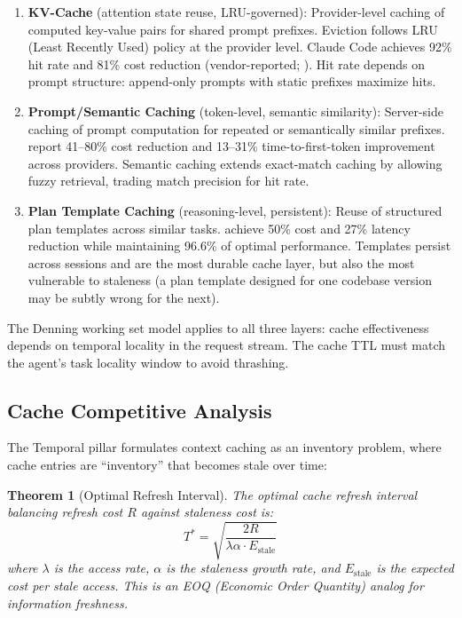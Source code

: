 \documentclass[11pt, a4paper]{googledeepmind}
\newtheorem{theorem}{Theorem}[section]
\begin{document}
\begin{enumerate}
    \item \textbf{KV-Cache} (attention state reuse, LRU-governed): Provider-level caching of computed key-value pairs for shared prompt prefixes. Eviction follows LRU (Least Recently Used) policy at the provider level. Claude Code achieves 92\% hit rate and 81\% cost reduction (vendor-reported; \citealt{anthropic2026agentic}). Hit rate depends on prompt structure: append-only prompts with static prefixes maximize hits.

    \item \textbf{Prompt/Semantic Caching} (token-level, semantic similarity): Server-side caching of prompt computation for repeated or semantically similar prefixes. \citet{liang2026cache} report 41--80\% cost reduction and 13--31\% time-to-first-token improvement across providers. Semantic caching extends exact-match caching by allowing fuzzy retrieval, trading match precision for hit rate.

    \item \textbf{Plan Template Caching} (reasoning-level, persistent): Reuse of structured plan templates across similar tasks. \citet{zhang2025apc} achieve 50\% cost and 27\% latency reduction while maintaining 96.6\% of optimal performance. Templates persist across sessions and are the most durable cache layer, but also the most vulnerable to staleness (a plan template designed for one codebase version may be subtly wrong for the next).
\end{enumerate}

The Denning working set model \citep{denning1968working} applies to all three layers: cache effectiveness depends on temporal locality in the request stream. The cache TTL must match the agent's task locality window to avoid thrashing.

\subsection{Cache Competitive Analysis}

The Temporal pillar formulates context caching as an inventory problem, where cache entries are ``inventory'' that becomes stale over time:

\begin{theorem}[Optimal Refresh Interval]
\label{thm:cache-eoq}
The optimal cache refresh interval balancing refresh cost $R$ against staleness cost is:
\begin{equation}
    T^* = \sqrt{\frac{2R}{\lambda \alpha \cdot E_{\text{stale}}}}
\end{equation}
where $\lambda$ is the access rate, $\alpha$ is the staleness growth rate, and $E_{\text{stale}}$ is the expected cost per stale access. This is an EOQ (Economic Order Quantity) analog for information freshness.
\end{theorem}
\end{document}
